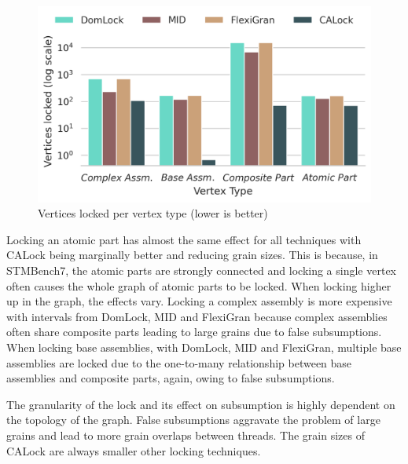 \begin{figure}
	\centering
	\includegraphics[width=\columnwidth]{figures/PerformanceCharts/ContainmentRatio}
	\caption{Vertices locked per vertex type (lower is better)}
	\label{nodesLockedPerNodeType}
\end{figure}

Locking an atomic part has almost the same effect for all techniques with CALock being marginally better and reducing grain sizes. 
This is because, in STMBench7, the atomic parts are strongly connected and locking a single vertex often causes the whole graph of atomic parts to be locked. 
When locking higher up in the graph, the effects vary. 
Locking a complex assembly is more expensive with intervals from DomLock, MID and FlexiGran because complex assemblies often share composite parts leading to large grains due to false subsumptions.
When locking base assemblies, with DomLock, MID and FlexiGran, multiple base assemblies are locked due to the one-to-many relationship between base assemblies and composite parts, again, owing to false subsumptions. 

The granularity of the lock and its effect on subsumption is highly dependent on the topology of the graph. 
False subsumptions aggravate the problem of large grains and lead to more grain overlaps between threads. 
The grain sizes of CALock are always smaller other locking techniques.



